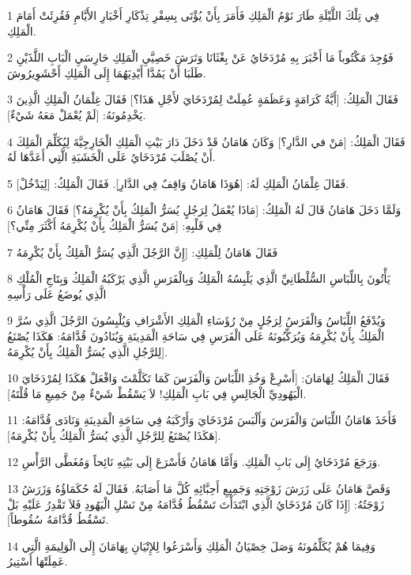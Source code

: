 \par 1 فِي تِلْكَ اللَّيْلَةِ طَارَ نَوْمُ الْمَلِكِ فَأَمَرَ بِأَنْ يُؤْتَى بِسِفْرِ تِذْكَارِ أَخْبَارِ الأَيَّامِ فَقُرِئَتْ أَمَامَ الْمَلِكِ.
\par 2 فَوُجِدَ مَكْتُوباً مَا أَخْبَرَ بِهِ مُرْدَخَايُ عَنْ بِغْثَانَا وَتَرَشَ خَصِيَّيِ الْمَلِكِ حَارِسَيِ الْبَابِ اللَّذَيْنِ طَلَبَا أَنْ يَمُدَّا أَيْدِيَهُمَا إِلَى الْمَلِكِ أَحْشَوِيرُوشَ.
\par 3 فَقَالَ الْمَلِكُ: [أَيَّةُ كَرَامَةٍ وَعَظَمَةٍ عُمِلَتْ لِمُرْدَخَايَ لأَجْلِ هَذَا؟] فَقَالَ غِلْمَانُ الْمَلِكِ الَّذِينَ يَخْدِمُونَهُ: [لَمْ يُعْمَلْ مَعَهُ شَيْءٌ].
\par 4 فَقَالَ الْمَلِكُ: [مَنْ في الدَّارِ؟] وَكَانَ هَامَانُ قَدْ دَخَلَ دَارَ بَيْتِ الْمَلِكِ الْخَارِجِيَّةَ لِيُكَلِّمَ الْمَلِكَ أَنْ يُصْلَبَ مُرْدَخَايُ عَلَى الْخَشَبَةِ الَّتِي أَعَدَّهَا لَهُ.
\par 5 فَقَالَ غِلْمَانُ الْمَلِكِ لَهُ: [هُوَذَا هَامَانُ وَاقِفٌ فِي الدَّارِ]. فَقَالَ الْمَلِكُ: [لِيَدْخُلْ].
\par 6 وَلَمَّا دَخَلَ هَامَانُ قَالَ لَهُ الْمَلِكُ: [مَاذَا يُعْمَلُ لِرَجُلٍ يُسَرُّ الْمَلِكُ بِأَنْ يُكْرِمَهُ؟] فَقَالَ هَامَانُ فِي قَلْبِهِ: [مَنْ يُسَرُّ الْمَلِكُ بِأَنْ يُكْرِمَهُ أَكْثَرَ مِنِّي؟]
\par 7 فَقَالَ هَامَانُ لِلْمَلِكِ: [إِنَّ الرَّجُلَ الَّذِي يُسَرُّ الْمَلِكُ بِأَنْ يُكْرِمَهُ
\par 8 يَأْتُونَ بِاللِّبَاسِ السُّلْطَانِيِّ الَّذِي يَلْبِسُهُ الْمَلِكُ وَبِالْفَرَسِ الَّذِي يَرْكَبُهُ الْمَلِكُ وَبِتَاجِ الْمُلْكِ الَّذِي يُوضَعُ عَلَى رَأْسِهِ
\par 9 وَيُدْفَعُ اللِّبَاسُ وَالْفَرَسُ لِرَجُلٍ مِنْ رُؤَسَاءِ الْمَلِكِ الأَشْرَافِ وَيُلْبِسُونَ الرَّجُلَ الَّذِي سُرَّ الْمَلِكُ بِأَنْ يُكْرِمَهُ وَيُرَكِّبُونَهُ عَلَى الْفَرَسِ فِي سَاحَةِ الْمَدِينَةِ وَيُنَادُونَ قُدَّامَهُ: هَكَذَا يُصْنَعُ لِلرَّجُلِ الَّذِي يُسَرُّ الْمَلِكُ بِأَنْ يُكْرِمَهُ].
\par 10 فَقَالَ الْمَلِكُ لِهَامَانَ: [أَسْرِعْ وَخُذِ اللِّبَاسَ وَالْفَرَسَ كَمَا تَكَلَّمْتَ وَافْعَلْ هَكَذَا لِمُرْدَخَايَ الْيَهُودِيِّ الْجَالِسِ فِي بَابِ الْمَلِكِ! لاَ يَسْقُطْ شَيْءٌ مِنْ جَمِيعِ مَا قُلْتَهُ].
\par 11 فَأَخَذَ هَامَانُ اللِّبَاسَ وَالْفَرَسَ وَأَلْبَسَ مُرْدَخَايَ وَأَرْكَبَهُ فِي سَاحَةِ الْمَدِينَةِ وَنَادَى قُدَّامَهُ: [هَكَذَا يُصْنَعُ لِلرَّجُلِ الَّذِي يُسَرُّ الْمَلِكُ بِأَنْ يُكْرِمَهُ].
\par 12 وَرَجَعَ مُرْدَخَايُ إِلَى بَابِ الْمَلِكِ. وَأَمَّا هَامَانُ فَأَسْرَعَ إِلَى بَيْتِهِ نَائِحاً وَمُغَطَّى الرَّأْسِ.
\par 13 وَقَصَّ هَامَانُ عَلَى زَرَشَ زَوْجَتِهِ وَجَمِيعِ أَحِبَّائِهِ كُلَّ مَا أَصَابَهُ. فَقَالَ لَهُ حُكَمَاؤُهُ وَزَرَشُ زَوْجَتُهُ: [إِذَا كَانَ مُرْدَخَايُ الَّذِي ابْتَدَأْتَ تَسْقُطُ قُدَّامَهُ مِنْ نَسْلِ الْيَهُودِ فَلاَ تَقْدِرُ عَلَيْهِ بَلْ تَسْقُطُ قُدَّامَهُ سُقُوطاً].
\par 14 وَفِيمَا هُمْ يُكَلِّمُونَهُ وَصَلَ خِصْيَانُ الْمَلِكِ وَأَسْرَعُوا لِلإِتْيَانِ بِهَامَانَ إِلَى الْوَلِيمَةِ الَّتِي عَمِلَتْهَا أَسْتِيرُ.

